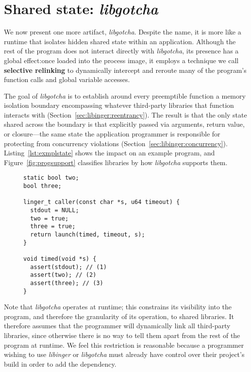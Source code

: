 \section{Shared state: \textit{libgotcha}}
\label{sec:libgotcha}

We now present one more artifact, \textit{libgotcha}.
Despite the name, it is more like a runtime that isolates hidden shared state
within an application.  Although the rest of the
program does not interact directly with \textit{libgotcha}, its presence has a
global effect:\@ once loaded into the process image, it employs a technique we call
\textbf{selective relinking} to dynamically intercept and reroute many of the
program's function
calls and global variable accesses.

The goal of \textit{libgotcha} is to establish around every preemptible function a
memory isolation boundary encompassing whatever third-party libraries that function
interacts with (Section~\ref{sec:libinger:reentrancy}).  The result is that the only
state shared across the boundary is that explicitly passed via arguments,
return value, or closure---the same state the application programmer is responsible
for protecting from concurrency violations (Section~\ref{sec:libinger:concurrency}).
Listing~\ref{lst:exmplstate} shows the impact on an example program, and
Figure~\ref{fig:progsupport} classifies libraries by how \textit{libgotcha} supports
them.

\begin{figure}
\begin{lstlisting}[label=lst:exmplstate,caption=Demo of isolated \textnormal{(1)} vs.\ shared \textnormal{(2\&3)} state]
static bool two;
bool three;

linger_t caller(const char *s, u64 timeout) {
  stdout = NULL;
  two = true;
  three = true;
  return launch(timed, timeout, s);
}

void timed(void *s) {
  assert(stdout); // (1)
  assert(two); // (2)
  assert(three); // (3)
}
\end{lstlisting}
\end{figure}

Note that \textit{libgotcha} operates at runtime; this constrains its visibility
into the program, and therefore the granularity of its operation, to shared
libraries.  It therefore
assumes that the programmer will dynamically link all third-party libraries, since
otherwise there is no way to tell them apart from the rest of the program at runtime.
We feel this restriction is reasonable because a programmer wishing to use
\textit{libinger} or \textit{libgotcha} must already have control over their
project's build in order to add the dependency.

